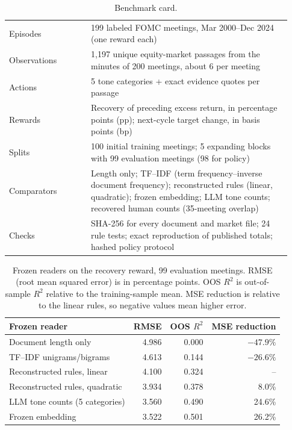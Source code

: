 \documentclass[sigconf]{acmart}
\begin{document}
\begin{table}[t]
\caption{Benchmark card.}
\label{tab:card}
\small
\begin{tabular}{@{}p{0.27\linewidth}p{0.66\linewidth}@{}}
\toprule
Episodes & 199 labeled FOMC meetings, Mar 2000--Dec 2024 (one reward each) \\
Observations & 1,197 unique equity-market passages from the minutes of 200 meetings, about 6 per meeting \\
Actions & 5 tone categories + exact evidence quotes per passage \\
Rewards & Recovery of preceding excess return, in percentage points (pp); next-cycle target change, in basis points (bp) \\
Splits & 100 initial training meetings; 5 expanding blocks with 99 evaluation meetings (98 for policy) \\
Comparators & Length only; TF--IDF (term frequency--inverse document frequency); reconstructed rules (linear, quadratic); frozen embedding; LLM tone counts; recovered human counts (35-meeting overlap) \\
Checks & SHA-256 for every document and market file; 24 rule tests; exact reproduction of published totals; hashed policy protocol \\
\bottomrule
\end{tabular}
\end{table}

\begin{table}[t]
\caption{Frozen readers on the recovery reward, 99 evaluation meetings. RMSE (root mean squared error) is in percentage points. OOS $R^2$ is out-of-sample $R^2$ relative to the training-sample mean. MSE reduction is relative to the linear rules, so negative values mean higher error.}
\label{tab:bench}
\small
\begin{tabular}{@{}lrrr@{}}
\toprule
Frozen reader & RMSE & OOS $R^2$ & MSE reduction \\
\midrule
Document length only & 4.986 & 0.000 & $-47.9\%$ \\
TF--IDF unigrams/bigrams & 4.613 & 0.144 & $-26.6\%$ \\
Reconstructed rules, linear & 4.100 & 0.324 & -- \\
Reconstructed rules, quadratic & 3.934 & 0.378 & 8.0\% \\
LLM tone counts (5 categories) & 3.560 & 0.490 & 24.6\% \\
Frozen embedding & 3.522 & 0.501 & 26.2\% \\
\bottomrule
\end{tabular}
\end{table}
\end{document}
